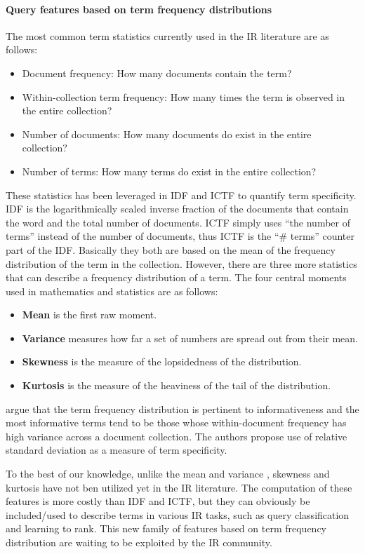 \paragraph{Query features based on term frequency distributions}

The most common term statistics currently used in the IR literature are as follows: 
 
\begin{itemize}
  \item Document frequency: How many documents contain the term?
  \item Within-collection term frequency: How many times the term is observed in the entire collection?
  \item Number of documents: How many documents do exist in the entire collection?
  \item Number of terms: How many terms do exist in the entire collection?
\end{itemize}

These statistics has been leveraged in IDF and ICTF to quantify term specificity.
IDF is the logarithmically scaled inverse fraction of the documents that contain the word and the total number of documents.
ICTF simply uses ``the number of terms'' instead of the number of documents, thus ICTF is the ``\# terms'' counter part of the IDF.
Basically they both are based on the mean of the frequency distribution of the term in the collection.
However, there are three more statistics that can describe a frequency distribution of a term.
The four central moments used in mathematics and statistics are as follows: 
\begin{itemize}
  \item \textbf{Mean} is the first raw moment.
  \item \textbf{Variance} measures how far a set of numbers are spread out from their mean.
  \item \textbf{Skewness} is the measure of the lopsidedness of the distribution.
  \item \textbf{Kurtosis} is the measure of the heaviness of the tail of the distribution.
\end{itemize}

\citet*{Variance} argue that the term frequency distribution is pertinent to informativeness and the most informative terms tend to be those whose within-document frequency has high variance across a document collection.
The authors propose use of relative standard deviation as a measure of term specificity.

To the best of our knowledge, unlike the mean and variance \citep{Variance}, skewness and kurtosis have not ben utilized yet in the IR literature.
The computation of these features is more costly than IDF and ICTF, but they can obviously be included/used to describe terms in various IR tasks, such as query classification and learning to rank.
This new family of features based on term frequency distribution are waiting to be exploited by the IR community.



